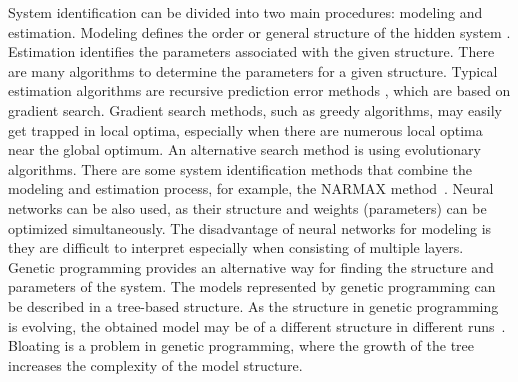 System identification can be divided into two main procedures: modeling and estimation. Modeling defines the order or general structure of the hidden system \cite{Fogel_1991}. Estimation identifies the parameters associated with the given structure. There are many algorithms to determine the parameters for a given structure. Typical estimation algorithms are recursive prediction error methods \cite{Ljungquist1993}, which are based on gradient search. Gradient search methods, such as greedy algorithms, may easily get trapped in local optima, especially when there are numerous local optima near the global optimum. An alternative search method is using evolutionary algorithms. There are some system identification methods that combine the modeling and estimation process, for example, the NARMAX method~\cite{Billings2013}. Neural networks can be also used, as their structure and weights (parameters) can be optimized simultaneously. The disadvantage of neural networks for modeling is they are difficult to interpret especially when consisting of multiple layers. Genetic programming provides an alternative way for finding the structure and parameters of the system. The models represented by genetic programming can be described in a tree-based structure. As the structure in genetic programming is evolving, the obtained model may be of a different structure in different runs~\cite{Vladislavleva:2009}. Bloating \cite{Eiben2003} is a problem in genetic programming, where the growth of the tree increases the complexity of the model structure. 


